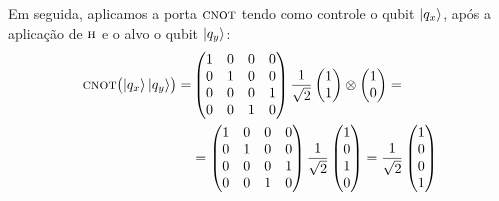 Em seguida, aplicamos a porta \(\operatorname{\textsc{cnot}}\) tendo como controle o qubit $\ket{q_x}$, após a aplicação de \(\operatorname{\textsc{h}}\) e o alvo o qubit $\ket{q_y}$:
\begin{equation}
	\begin{split}
 		\CNOT \bigl( \ket{q_x}\ket{q_y} \bigr) =& 
		\begin{pmatrix}
		1 & 0 & 0 & 0 \\
		0 & 1 & 0 & 0 \\
		0 & 0 & 0 & 1 \\
		0 & 0 & 1 & 0
		\end{pmatrix} 
		\frac{1}{\sqrt{2}} \begin{pmatrix*}[r]
		1 \\
		1
		\end{pmatrix*} \otimes  \begin{pmatrix*}[r]
		1 \\
		0
		\end{pmatrix*} = \\
		&= \begin{pmatrix}
		1 & 0 & 0 & 0 \\
		0 & 1 & 0 & 0 \\
		0 & 0 & 0 & 1 \\
		0 & 0 & 1 & 0
		\end{pmatrix} \frac{1}{\sqrt{2}}\begin{pmatrix}
		1 \\
		0 \\
		1 \\
		0
		\end{pmatrix} = \frac{1}{\sqrt{2}} \begin{pmatrix}
		1 \\
		0 \\
		0 \\
		1
		\end{pmatrix}
	\end{split}	
\end{equation}

